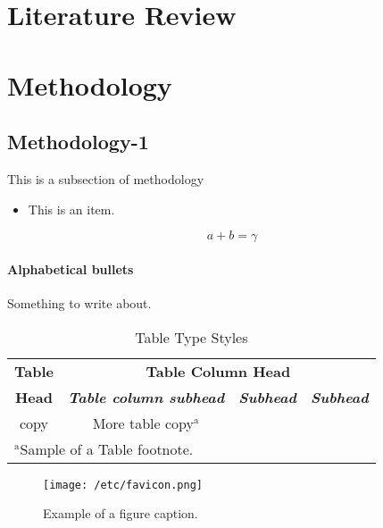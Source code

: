\documentclass[conference]{IEEEtran}
\begin{document}
\section{Literature Review}


\section{Methodology}
\subsection{Methodology-1}\label{AA}
This is a subsection of methodology 

\begin{itemize}
\item This is an item.
\end{itemize}

\begin{equation}
a+b=\gamma\label{eq}
\end{equation}

\paragraph{Alphabetical bullets} Something to write about.
\begin{table}[htbp]
\caption{Table Type Styles}
\begin{center}
\begin{tabular}{|c|c|c|c|}
\hline
\textbf{Table}&\multicolumn{3}{|c|}{\textbf{Table Column Head}} \\
\cline{2-4} 
\textbf{Head} & \textbf{\textit{Table column subhead}}& \textbf{\textit{Subhead}}& \textbf{\textit{Subhead}} \\
\hline
copy& More table copy$^{\mathrm{a}}$& &  \\
\hline
\multicolumn{4}{l}{$^{\mathrm{a}}$Sample of a Table footnote.}
\end{tabular}
\label{tab1}
\end{center}
\end{table}

\begin{figure}[htbp]
\centerline{
\texttt{[image: /etc/favicon.png]}
}
\caption{Example of a figure caption.}
\label{fig}
\end{figure}
\end{document}
